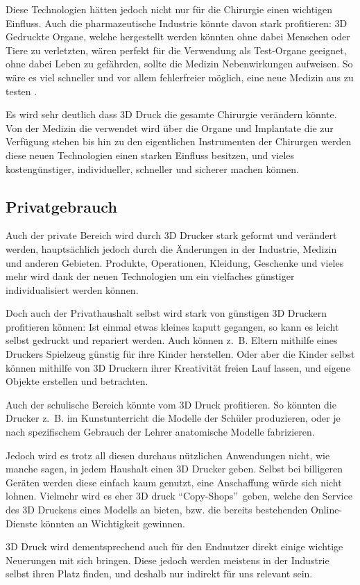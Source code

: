 Diese Technologien hätten jedoch nicht nur für die Chirurgie einen wichtigen Einfluss. Auch die pharmazeutische Industrie könnte davon stark profitieren: 3D Gedruckte Organe, welche hergestellt werden könnten ohne dabei Menschen oder Tiere zu verletzten, wären perfekt für die Verwendung als Test-Organe geeignet, ohne dabei Leben zu gefährden, sollte die Medizin Nebenwirkungen aufweisen. So wäre es viel schneller und vor allem fehlerfreier möglich, eine neue Medizin aus zu testen \parencite{ORGANOVO}. 

Es wird sehr deutlich dass 3D Druck die gesamte Chirurgie verändern könnte. Von der Medizin die verwendet wird über die Organe und Implantate die zur Verfügung stehen bis hin zu den eigentlichen Instrumenten der Chirurgen werden diese neuen Technologien einen starken Einfluss besitzen, und vieles kostengünstiger, individueller, schneller und sicherer machen können.

\newpage
\subsection{Privatgebrauch}

Auch der private Bereich wird durch 3D Drucker stark geformt und verändert werden, hauptsächlich jedoch durch die Änderungen in der Industrie, Medizin und anderen Gebieten. Produkte, Operationen, Kleidung, Geschenke und vieles mehr wird dank der neuen Technologien um ein vielfaches günstiger individualisiert werden können.

Doch auch der Privathaushalt selbst wird stark von günstigen 3D Druckern profitieren können: Ist einmal etwas kleines kaputt gegangen, so kann es leicht selbst gedruckt und repariert werden. Auch können z.~B. Eltern mithilfe eines Druckers Spielzeug günstig für ihre Kinder herstellen. Oder aber die Kinder selbst können mithilfe von 3D Druckern ihrer Kreativität freien Lauf lassen, und eigene Objekte erstellen und betrachten. 

Auch der schulische Bereich könnte vom 3D Druck profitieren. So könnten die Drucker z.~B. im Kunstunterricht die Modelle der Schüler produzieren, oder je nach spezifischem Gebrauch der Lehrer anatomische Modelle fabrizieren.

Jedoch wird es trotz all diesen durchaus nützlichen Anwendungen nicht, wie manche sagen, in jedem Haushalt einen 3D Drucker geben. Selbst bei billigeren Geräten werden diese einfach kaum genutzt, eine Anschaffung würde sich nicht lohnen. Vielmehr wird es eher 3D druck \textquotedblleft Copy-Shops\textquotedblright ~geben, welche den Service des 3D Druckens eines Modells an bieten, bzw. die bereits bestehenden Online-Dienste könnten an Wichtigkeit gewinnen.

3D Druck wird dementsprechend auch für den Endnutzer direkt einige wichtige Neuerungen mit sich bringen. Diese jedoch werden meistens in der Industrie selbst ihren Platz finden, und deshalb nur indirekt für uns relevant sein.